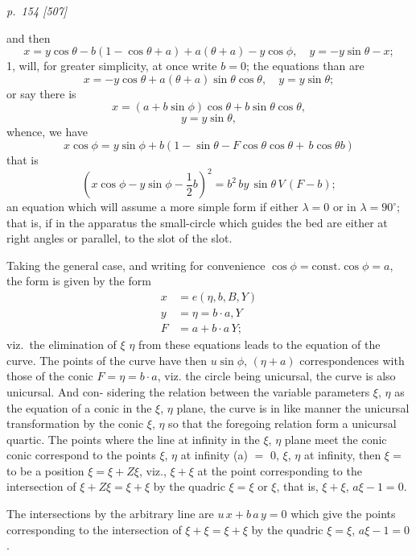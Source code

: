\documentclass[11pt,a4paper]{book}
\begin{document}
\clearpage

\bigskip
\textit{p.~154 [507]}
\smallskip

\noindent
and then
\[
x = y\cos\theta - b(1 - \cos\theta + a) + a(\theta + a) - y\cos\phi,\quad y = -y\sin\theta - x;
\]
1, will, for greater simplicity, at once write $b = 0$; the equations than are
\[
x = -y\cos\theta + a(\theta + a)\sin\theta\cos\theta,\quad y = y\sin\theta;
\]
or say there is
\[
x = (a + b\sin\phi)\cos\theta + b\sin\theta\cos\theta,
\]
\[
y = y\sin\theta,
\]
whence, we have
\[
x \cos\phi = y \sin\phi + b(1 - \sin\theta - F\cos\theta\cos\theta + \,b\cos\theta b)
\]
that is
\[
(x \cos\phi - y\sin\phi - \frac{1}{2} b)^2 = b^2\,by\,\sin\theta\,V\,(F - b);
\]
an equation which will assume a more simple form if either $\lambda = 0$ or in $\lambda = 90^\circ$; that is,
if in the apparatus the small-circle which guides the bed are either at right angles or
parallel, to the slot of the slot.

Taking the general case, and writing for convenience $\cos\phi = \mathrm{const.}\cos\phi = a$, the
form is given by the form
\begin{align*}
x &= e(\eta, b, B,Y)\\
y &= \eta = b\cdot a,Y\\
F & = a + b\cdot a\,Y;
\end{align*}
viz.\ the elimination of $\xi$ $\eta$ from these equations leads to the equation of the curve.
The points of the curve have then $u\sin\phi$, $(\eta + a)$ correspondences with those of the conic
$F = \eta = b\cdot a$, viz. the circle being unicursal, the curve is also unicursal. And con-
sidering the relation between the variable parameters $\xi$, $\eta$ as the equation of a conic in the
$\xi$, $\eta$ plane, the curve is in like manner the unicursal transformation by the conic
$\xi$, $\eta$ so that the foregoing relation form a unicursal quartic.
The points where the line at infinity in the $\xi$, $\eta$ plane meet the conic conic correspond
to the points $\xi$, $\eta$ at infinity (a) $=$ $0$, $\xi$, $\eta$ at infinity, then $\xi = $ to be
a position $\xi = \xi + Z\xi$, viz., $\xi + \xi$ at the point corresponding to
the intersection of $\xi + Z\xi = \xi + \xi$ by the quadric $\xi = \xi$ or $\xi$, that is, $\xi + \xi$, $a\xi - 1 = 0$.

The intersections by the arbitrary line are $u\,x + b\,a\,y = 0$ which give the points corresponding to
the intersection of $\xi + \xi = \xi + \xi$ by the quadric $\xi = \xi$, $a\xi - 1 = 0$.

\clearpage
\end{document}
